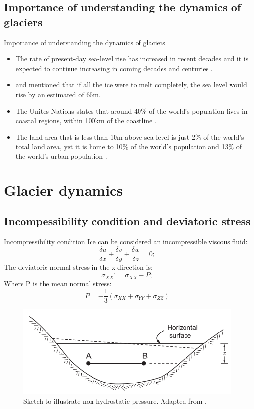 \documentclass[11pt]{beamer}
\begin{document}
	\subsection{Importance of understanding the dynamics of glaciers}
		\begin{frame}{Importance of understanding the dynamics of glaciers}
		\justifying
		\begin{itemize}
			\item The rate of present-day sea-level rise has increased in recent decades and it is expected to continue increasing in coming decades and centuries \cite[]{clark2015recent}.
			\item \cite{morlighem2017bedmachine} and \cite{haywood2011pliocene} mentioned that if all the ice were to melt completely, the sea level would rise by an estimated of 65m.
			\item The Unites Nations states that around 40\% of the world's population lives in coastal regions, within 100km of the coastline \cite[]{barbier2015climate, montgomery2007united}.
			\item The land area that is less than 10m above sea level is just 2\% of the world's total land area, yet it is home to 10\% of the world's population and 13\% of the world's urban population \cite[]{nevermann2023land}.
		\end{itemize}
		\end{frame}
	\section{Glacier dynamics}

	\subsection{Incompessibility condition and deviatoric stress}
		\begin{frame}{Incompressibility condition}
		\justifying
		Ice can be considered an incompressible viscous fluid:
		\begin{equation}
			\frac{\delta u}{\delta x}+\frac{\delta v}{\delta y}+\frac{\delta w}{\delta z}=0;
		\end{equation}
		The deviatoric normal stress in the x-direction is:
		\begin{equation}
			\sigma_{XX}'= \sigma_{XX}-P;
		\end{equation}
		Where P is the mean normal stress:
		\begin{equation}
			P=-\frac{1}{3}({\sigma_{XX}+\sigma_{YY}+\sigma_{ZZ}})
		\end{equation}
		\begin{figure}
			\centering
			\includegraphics[width=0.4\linewidth]{../fig/Non_hydrostatic_pressure.png}
			\caption{Sketch to illustrate non-hydrostatic pressure. Adapted from \cite{hooke2019principles}.}
			\label{Deviatoric_stress}
		\end{figure}
		\end{frame}
\end{document}
